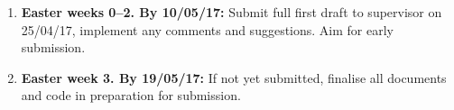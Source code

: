 \documentclass[11pt]{scrartcl}
\begin{document}
\begin{enumerate}
\item \textbf{Easter weeks 0--2. By 10/05/17:} Submit full first draft to supervisor on 25/04/17, implement any comments and suggestions. Aim for early submission.

\item \textbf{Easter week 3. By 19/05/17:} If not yet submitted, finalise all documents and code in preparation for submission.

\end{enumerate}

\printbibliography
\end{document}
